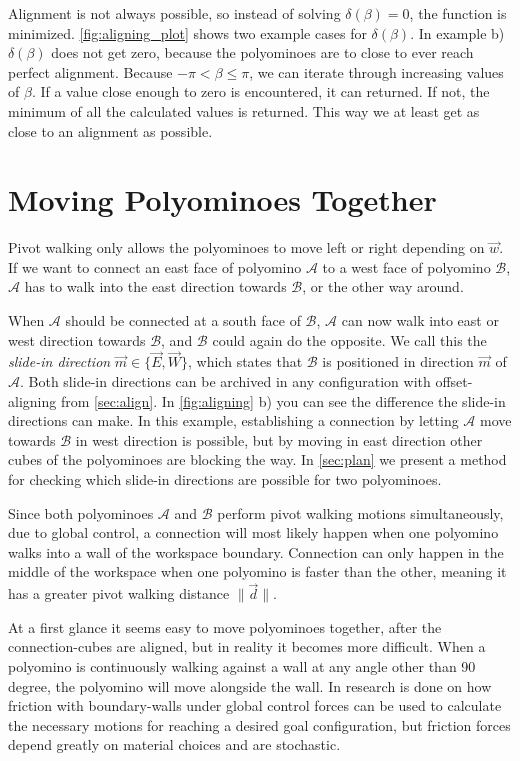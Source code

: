 Alignment is not always possible, so instead of solving $\delta(\beta) = 0$, the function is minimized.
\autoref{fig:aligning_plot} shows two example cases for $\delta(\beta)$.
In example b) $\delta(\beta)$ does not get zero, because the polyominoes are to close to ever reach perfect alignment.
Because $-\pi < \beta \leq \pi$, we can iterate through increasing values of $\beta$.
If a value close enough to zero is encountered, it can returned.
If not, the minimum of all the calculated values is returned.
This way we at least get as close to an alignment as possible.


\section{Moving Polyominoes Together}
\label{sec:walk_wait}

Pivot walking only allows the polyominoes to move left or right depending on $\vec{w}$.
If we want to connect an east face of polyomino $\mathcal{A}$ to a west face of polyomino $\mathcal{B}$, $\mathcal{A}$ has to walk into the east direction towards $\mathcal{B}$, or the other way around.

When $\mathcal{A}$ should be connected at a south face of $\mathcal{B}$, $\mathcal{A}$ can now walk into east or west direction towards $\mathcal{B}$, and $\mathcal{B}$ could again do the opposite.
We call this the \textit{slide-in direction} $\vec{m} \in \{\vec{E}, \vec{W}\}$, which states that $\mathcal{B}$ is positioned in direction $\vec{m}$ of $\mathcal{A}$.
Both slide-in directions can be archived in any configuration with offset-aligning from \autoref{sec:align}.
In \autoref{fig:aligning} b) you can see the difference the slide-in directions can make.
In this example, establishing a connection by letting $\mathcal{A}$ move towards $\mathcal{B}$ in west direction is possible, but by moving in east direction other cubes of the polyominoes are blocking the way.
In \autoref{sec:plan} we present a method for checking which slide-in directions are possible for two polyominoes. 

Since both polyominoes $\mathcal{A}$ and $\mathcal{B}$ perform pivot walking motions simultaneously, due to global control, a connection will most likely happen when one polyomino walks into a wall of the workspace boundary.
Connection can only happen in the middle of the workspace when one polyomino is faster than the other, meaning it has a greater pivot walking distance $\lVert \vec{d} \rVert$.

At a first glance it seems easy to move polyominoes together, after the connection-cubes are aligned, but in reality it becomes more difficult.
When a polyomino is continuously walking against a wall at any angle other than 90 degree, the polyomino will move alongside the wall.
In \cite{schmidt2020} research is done on how friction with boundary-walls under global control forces can be used to calculate the necessary motions for reaching a desired goal configuration, but friction forces depend greatly on material choices and are stochastic.

